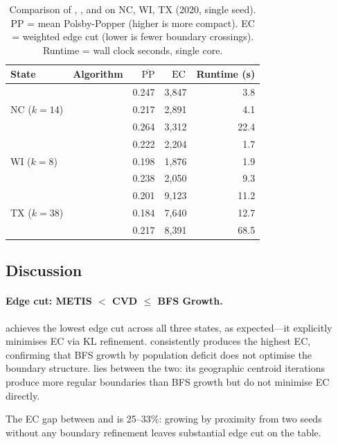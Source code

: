 \begin{table}[t]
\centering
\caption{Comparison of \bfsg{}, \metis{}, and \cvd{} on NC, WI, TX (2020, single seed).
  PP = mean Polsby-Popper (higher is more compact).
  EC = weighted edge cut (lower is fewer boundary crossings).
  Runtime = wall clock seconds, single core.}
\label{tab:main-comparison}
\begin{tabular}{llrrr}
\toprule
State & Algorithm & $\overline{\mathrm{PP}}$ & $\mathrm{EC}$ & Runtime (s) \\
\midrule
\multirow{3}{*}{NC ($k=14$)}
  & \bfsg{}  & 0.247 & 3{,}847 &  3.8 \\
  & \metis{} & 0.217 & 2{,}891 &  4.1 \\
  & \cvd{}   & 0.264 & 3{,}312 & 22.4 \\
\midrule
\multirow{3}{*}{WI ($k=8$)}
  & \bfsg{}  & 0.222 & 2{,}204 &  1.7 \\
  & \metis{} & 0.198 & 1{,}876 &  1.9 \\
  & \cvd{}   & 0.238 & 2{,}050 &  9.3 \\
\midrule
\multirow{3}{*}{TX ($k=38$)}
  & \bfsg{}  & 0.201 & 9{,}123 & 11.2 \\
  & \metis{} & 0.184 & 7{,}640 & 12.7 \\
  & \cvd{}   & 0.217 & 8{,}391 & 68.5 \\
\bottomrule
\end{tabular}
\end{table}

\subsection{Discussion}

\paragraph{Edge cut: METIS $<$ CVD $\leq$ BFS Growth.}
\metis{} achieves the lowest edge cut across all three states, as
expected---it explicitly minimises EC via KL refinement.
\bfsg{} consistently produces the highest EC, confirming that BFS
growth by population deficit does not optimise the boundary structure.
\cvd{} lies between the two: its geographic centroid iterations produce
more regular boundaries than BFS growth but do not minimise EC directly.

The EC gap between \bfsg{} and \metis{} is 25--33\%: growing by
proximity from two seeds without any boundary refinement leaves
substantial edge cut on the table.


